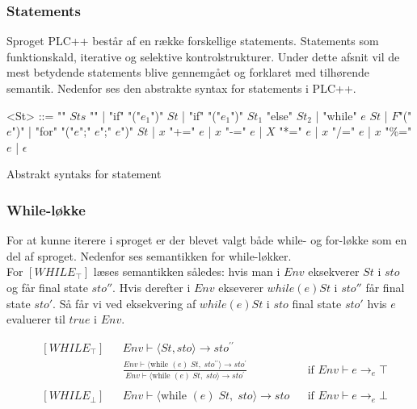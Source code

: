 \noindent \subsubsection{Statements}
Sproget PLC++ består af en række forskellige statements. Statements som funktionskald, iterative og selektive kontrolstrukturer. Under dette afsnit vil de mest betydende statements blive gennemgået og forklaret med tilhørende semantik. Nedenfor ses den abstrakte syntax for statements i PLC++.

\begin{Grammar}
 \begin{grammar}
 <St> ::= "{" $Sts$ "}" | "if" "("$e_1$")" $St$ | "if" "("$e_1$")" $St_1$ "else" $St_2$ | "while" $e$ $St$ | $F$"("$e$")" | "for" "("$e$";" $e$";" $e$")" $St$ | $x$ "+=" $e$ | $x$ "-=" $e$ | $X$ "*=" $e$ | $x$ "/=" $e$ | $x$ "\%=" $e$ | $\epsilon$
 \end{grammar}
 \caption{Abstrakt syntaks for statement}\label{gra:Statements}
\end{Grammar}


\subsubsection*{While-løkke}
For at kunne iterere i sproget er der blevet valgt både while- og for-løkke som en del af sproget. Nedenfor ses semantikken for while-løkker. \\

\noindent For $[WHILE_\top]$ læses semantikken således: 
hvis man i $Env$ eksekverer $St$ i $sto$ og får final state $sto''$. Hvis derefter i $Env$ ekseverer $while(e) St$ i $sto''$ får final state $sto'$. Så får vi ved eksekvering af $while(e) St$ i $sto$ final state $sto'$ hvis $e$ evaluerer til $true$ i $Env$.

\begin{align*}
&[WHILE_\top] & &Env \vdash \langle St, sto \rangle \rightarrow sto^{\prime\prime}\\
& & &\frac{Env \vdash \langle \text{while } (e)\; St,\; sto^{\prime\prime} \rangle \rightarrow sto^\prime}{Env \vdash \langle \text{while } (e)\; St,\; sto \rangle \rightarrow sto^\prime} & &\text{if } Env \vdash e \rightarrow_e \top\\\\
%
&[WHILE_\bot] & &Env \vdash \langle \text{while } (e)\; St,\; sto \rangle \rightarrow sto & &\text{if } Env \vdash e \rightarrow_e \bot\\\\
\end{align*}

